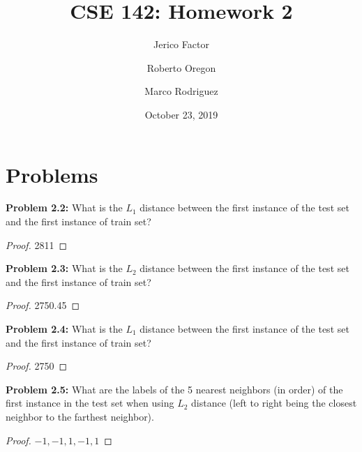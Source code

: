 \documentclass[11pt]{amsart}
\title{CSE 142:  Homework 2}
\author{Jerico Factor  \and Roberto Oregon \and Marco Rodriguez}
\date{October 23, 2019}  %
\newenvironment{problem}[1]
{\par \noindent \ignorespaces \textbf{Problem #1:}}
{}
\begin{document}
\maketitle

\section*{Problems}

\begin{problem}{2.2} 
What is the $L_1$ distance between the first instance of the test set and the first instance of train set? 
\end{problem}
\begin{proof} 
2811
\end{proof}

\begin{problem}{2.3} 
What is the $L_2$ distance between the first instance of the test set and the first instance of train set? 
\end{problem}
\begin{proof} 
2750.45
\end{proof}

\begin{problem}{2.4} 
What is the $L_1$ distance between the first instance of the test set and the first instance of train set? 
\end{problem}
\begin{proof} 
2750
\end{proof}

\begin{problem}{2.5} What are the labels of the 5 nearest neighbors (in order) of the first instance in the test set when using $L_2$ distance (left to right being the closest neighbor to the farthest neighbor).
\end{problem}
\begin{proof} $ -1, -1, 1, -1, 1$
\end{proof} 
\end{document}
